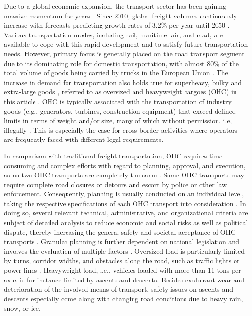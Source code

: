 
Due to a global economic expansion, the transport sector has been gaining massive momentum for years \cite{gungor2018detect}.
Since 2010, global freight volumes continuously increase with forecasts predicting growth rates of 3.2\% per year until 2050 \cite{figura2020preferences, InternationalTransportForum}.
Various transportation modes, including rail, maritime, air, and road, are available to cope with this rapid development and to satisfy future transportation needs.
However, primary focus is generally placed on the road transport segment due to its dominating role for domestic transportation, with almost 80\% of the total volume of goods being carried by trucks in the European Union \cite{Eurostat}.
The increase in demand for transportation also holds true for superheavy, bulky and extra-large goods \cite{gavrilova2021analysis}, referred to as oversized and heavyweight cargoes (OHC) in this article \cite{Luo.2021}.
OHC is typically associated with the transportation of industry goods (e.g., generators, turbines, construction equipment) that exceed defined limits in terms of weight and/or size, many of which without permission, i.e, illegally \cite{fiorillo2016minimizing}. This is especially the case for cross-border activities where operators are frequently faced with different legal requirements.
\par In comparison with traditional freight transportation, OHC requires time-consuming and complex efforts with regard to planning, approval, and execution, as no two OHC transports are completely the same \cite{Wolnowska.2019}.
Some OHC transports may require complete road closures or detours and escort by police or other law enforcement.
Consequently, planning is usually conducted on an individual level, taking the respective specifications of each OHC transport into consideration \cite{Bazaras.2013}.
In doing so, several relevant technical, administrative, and organizational criteria are subject of detailed analysis to reduce economic and social risks as well as political dispute, thereby increasing the general safety and societal acceptance of OHC transports \cite{Palsaitis.2012}.
Granular planning is further dependent on national legislation and involves the evaluation of multiple factors \cite{zhu2014vehicle}. Oversized load is particularly limited by turns, corridor widths, and obstacles along the road, such as traffic lights or power lines \cite{PETRASKA.2018, arentze2012context}. Heavyweight load, i.e., vehicles loaded with more than 11 tons per axle, is for instance limited by ascents and descents. Besides exuberant wear and deterioration of the involved means of transport, safety issues on ascents and descents especially come along with changing road conditions due to heavy rain, snow, or ice.
